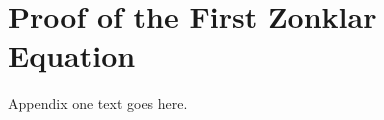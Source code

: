 \documentclass[journal]{IEEEtran}
\begin{document}
\appendices
\section{Proof of the First Zonklar Equation}
Appendix one text goes here.

\ifCLASSOPTIONcaptionsoff
  \newpage
\fi





%
%
%









\end{document}
